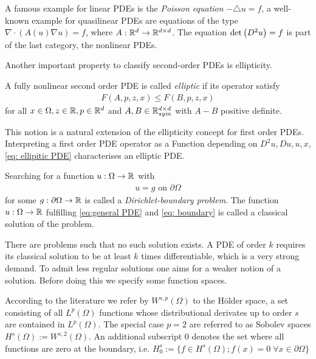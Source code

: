 A famous example for linear PDEs is the \emph{Poisson equation} $-\triangle u = f$,
a well-known example for quasilinear PDEs are equations of the type $\nabla \cdot (A(u) \nabla u) = f$, where $A: \mathbb{R}^d \rightarrow \mathbb{R}^{d \times d}  $. The \MA equation $\det{\left(D^2 u\right)} = f$ is part of the last category, the nonlinear PDEs. 

Another important property to classify second-order PDEs is ellipticity. 
\begin{definition}
	A fully nonlinear second order PDE is called \emph{elliptic} if its operator satisfy
	\begin{align}
		F(A,p,z,x) \leq F(B,p,z,x) \label{eq: ellipitic PDE}
	\end{align}
for all $x \in \Omega, z \in \mathbb{R}, p \in \mathbb{R}^d$ and $A,B \in \mathbb{R}^{d \times d}_{sym}$  with $A-B$ positive definite.

This notion is a natural extension of the ellipticity concept for first order PDEs. Interpreting a first order PDE operator as a Function depending on $D^2u, Du, u, x$, \eqref{eq: ellipitic PDE} characterises an elliptic PDE.
\end{definition}

Searching for a function $u:\Omega \rightarrow \mathbb{R}$ with 
\begin{align}
u=g \text{ on } \partial \Omega \label{eq: boundary}
\end{align}
for some $g:\partial \Omega \rightarrow \mathbb{R}$ is called a \emph{Dirichlet-boundary problem}. The function $u:\Omega \rightarrow \mathbb{R}$ fulfilling \eqref{eq:general PDE} and \eqref{eq: boundary} is called a classical solution of the problem. 

There are problems such that no such solution exists. A PDE of order $k$ requires its classical solution to be at least $k$ times differentiable, which is a very strong demand. To admit less regular solutions one aims for a weaker notion of a solution. Before doing this we specify some function spaces.

According to the literature we refer by $W^{s,p}(\Omega)$ to the H\"older space, a set consisting of all $L^p(\Omega)$ functions whose distributional derivates up to order $s$ are contained in $L^ p(\Omega)$.
 The special case $p=2$ are referred to as Sobolev spaces $H^s(\Omega):=W^{s,2}(\Omega)$. An additional subscript $0$ denotes the set where all functions are zero at the boundary, i.e. $H^s_0 :=\{f \in H^s(\Omega); f(x)=0 \; \forall x \in \partial \Omega\}$

